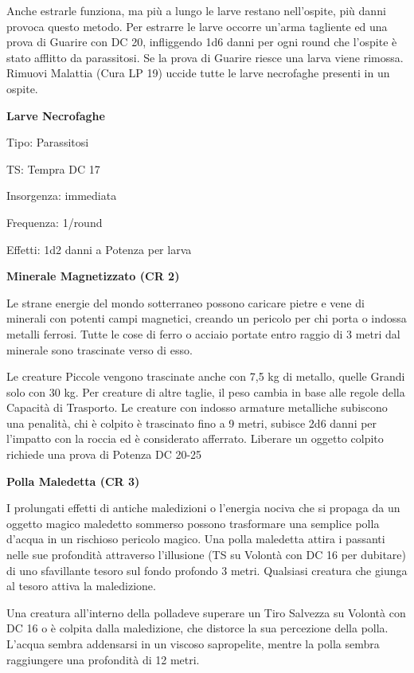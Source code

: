 \documentclass[a4paper,11pt,twoside,openany]{book}
\begin{document}
{Anche estrarle funziona, ma più a lungo le larve restano nell'ospite, più danni provoca questo metodo. Per estrarre le larve occorre un'arma tagliente ed una prova di Guarire con DC 20, infliggendo 1d6 danni per ogni round che l'ospite è stato afflitto da parassitosi. Se la prova di Guarire riesce una larva viene rimossa. Rimuovi Malattia (Cura LP 19) uccide tutte le larve necrofaghe presenti in un ospite.

\textbf{Larve Necrofaghe}

Tipo: Parassitosi

TS: Tempra DC 17

Insorgenza: immediata

Frequenza: 1/round

Effetti: 1d2 danni a Potenza per larva

\textbf{Minerale Magnetizzato (CR 2)}

Le strane energie del mondo sotterraneo possono caricare pietre e vene di minerali con potenti campi magnetici, creando un pericolo per chi porta o indossa metalli ferrosi. Tutte le cose di ferro o acciaio portate entro raggio di 3 metri dal minerale sono trascinate verso di esso.

Le creature Piccole vengono trascinate anche con 7,5 kg di metallo, quelle Grandi solo con 30 kg. Per creature di altre taglie, il peso cambia in base alle regole della Capacità di Trasporto. Le creature con indosso armature metalliche subiscono una penalità, chi è colpito è trascinato fino a 9 metri, subisce 2d6 danni per l'impatto con la roccia ed è considerato afferrato. Liberare un oggetto colpito richiede una prova di Potenza DC 20-25

\textbf{Polla Maledetta (CR 3)}

I prolungati effetti di antiche maledizioni o l'energia nociva che si propaga da un oggetto magico maledetto sommerso possono trasformare una semplice polla d'acqua in un rischioso pericolo magico. Una polla maledetta attira i passanti nelle sue profondità attraverso l'illusione (TS su Volontà con DC 16 per dubitare) di uno sfavillante tesoro sul fondo profondo 3 metri. Qualsiasi creatura che giunga al tesoro attiva la maledizione.

Una creatura all'interno della polladeve superare un Tiro Salvezza su Volontà con DC 16 o è colpita dalla maledizione, che distorce la sua percezione della polla. L'acqua sembra addensarsi in un viscoso sapropelite, mentre la polla sembra raggiungere una profondità di 12 metri.

}
\end{document}
